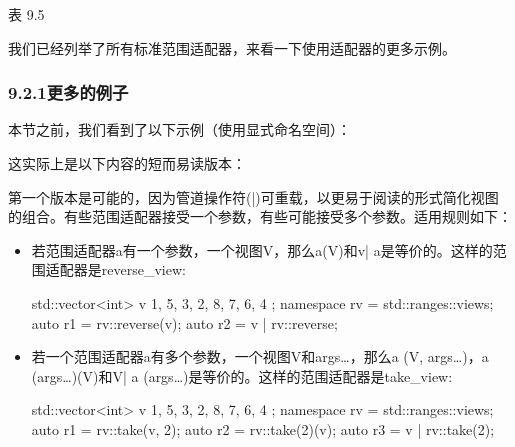 \begin{center}
表 9.5
\end{center}

我们已经列举了所有标准范围适配器，来看一下使用适配器的更多示例。

\subsubsection{9.2.1\hspace{0.2cm}更多的例子}

本节之前，我们看到了以下示例（使用显式命名空间）：


这实际上是以下内容的短而易读版本：


第一个版本是可能的，因为管道操作符(|)可重载，以更易于阅读的形式简化视图的组合。有些范围适配器接受一个参数，有些可能接受多个参数。适用规则如下：

\begin{itemize}
\item
若范围适配器a有一个参数，一个视图V，那么a(V)和v| a是等价的。这样的范围适配器是reverse\_view:

\begin{cpp}
std::vector<int> v{ 1, 5, 3, 2, 8, 7, 6, 4 };
namespace rv = std::ranges::views;
auto r1 = rv::reverse(v);
auto r2 = v | rv::reverse;
\end{cpp}

\item
若一个范围适配器a有多个参数，一个视图V和args…，那么a (V, args…)，a (args…)(V)和V| a (args…)是等价的。这样的范围适配器是take\_view:

\begin{cpp}
std::vector<int> v{ 1, 5, 3, 2, 8, 7, 6, 4 };
namespace rv = std::ranges::views;
auto r1 = rv::take(v, 2);
auto r2 = rv::take(2)(v);
auto r3 = v | rv::take(2);
\end{cpp}

\end{itemize}

